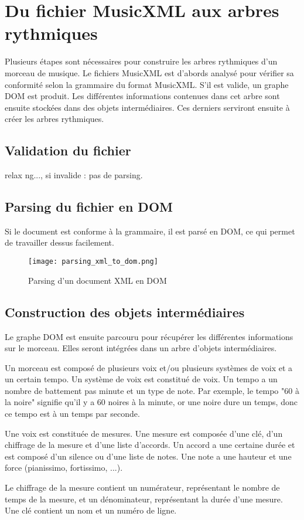 \section{Du fichier MusicXML aux arbres rythmiques}

Plusieurs étapes sont nécessaires pour construire les arbres rythmiques d'un morceau de musique. Le fichiers MusicXML est d'abords analysé pour vérifier sa conformité selon la grammaire du format MusicXML. S'il est valide, un graphe DOM est produit. Les différentes informations contenues dans cet arbre sont ensuite stockées dans des objets intermédiaires. Ces derniers serviront ensuite à créer les arbres rythmiques.


\subsection{Validation du fichier}

relax ng..., si invalide : pas de parsing.


\subsection{Parsing du fichier en DOM}

Si le document est conforme à la grammaire, il est parsé en DOM, ce qui permet de travailler dessus facilement.


\begin{figure}[!h]
\centering
\texttt{[image: parsing\_xml\_to\_dom.png]}\\[1cm]
\caption{Parsing d'un document XML en DOM}
\label{Parsing d'un document XML en DOM}
\end{figure}


\subsection{Construction des objets intermédiaires}

Le graphe DOM est ensuite parcouru pour récupérer les différentes informations sur le morceau. Elles seront intégrées dans un arbre d'objets intermédiaires.
\par
Un morceau est composé de plusieurs voix et/ou plusieurs systèmes de voix et a un certain tempo. Un système de voix est constitué de voix. Un tempo a un nombre de battement pas minute et un type de note. Par exemple, le tempo "60 à la noire" signifie qu'il y a 60 noires à la minute, or une noire dure un temps, donc ce tempo est à un temps par seconde.
\par
Une voix est constituée de mesures. Une mesure est composée d'une clé, d'un chiffrage de la mesure et d'une liste d'accords. Un accord a une certaine durée et est composé d'un silence ou d'une liste de notes. Une note a une hauteur et une force (pianissimo, fortissimo, ...).
\par
Le chiffrage de la mesure contient un numérateur, représentant le nombre de temps de la mesure, et un dénominateur, représentant la durée d’une mesure. Une clé contient un nom et un numéro de ligne.


